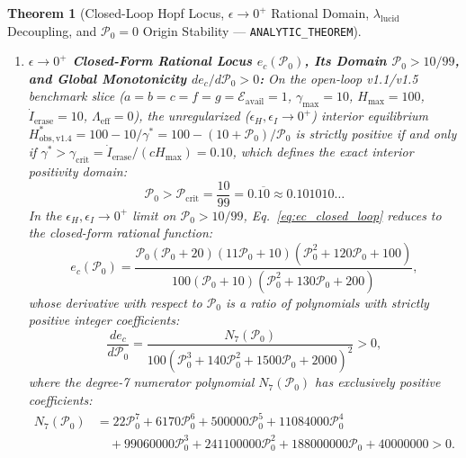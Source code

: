 \documentclass[11pt,a4paper]{article}
\newtheorem{theorem}{Theorem}
\theoremstyle{definition}
\begin{document}
\begin{theorem}[Closed-Loop Hopf Locus, $\epsilon \to 0^+$ Rational Domain, $\lambda_{\mathrm{lucid}}$ Decoupling, and $\mathcal{P}_0 = 0$ Origin Stability --- \texttt{ANALYTIC\_THEOREM}]
\begin{enumerate}
  \item \textbf{$\epsilon \to 0^+$ Closed-Form Rational Locus $e_c(\mathcal{P}_0)$, Its Domain $\mathcal{P}_0 > 10/99$, and Global Monotonicity $de_c/d\mathcal{P}_0 > 0$:} On the open-loop v1.1/v1.5 benchmark slice ($a=b=c=f=g=\mathcal{E}_{\mathrm{avail}}=1$, $\gamma_{\max}=10$, $H_{\max}=100$, $\dot{I}_{\mathrm{erase}}=10$, $\Lambda_{\mathrm{eff}}=0$), the unregularized ($\epsilon_H, \epsilon_I \to 0^+$) interior equilibrium $H_{\mathrm{obs},\mathrm{v1.4}}^* = 100 - 10/\gamma^* = 100 - (10+\mathcal{P}_0)/\mathcal{P}_0$ is strictly positive if and only if $\gamma^* > \gamma_{\mathrm{crit}} = \dot{I}_{\mathrm{erase}}/(c H_{\max}) = 0.10$, which defines the exact interior positivity domain:
  \begin{equation}
  \label{eq:Pcrit_domain}
  \mathcal{P}_0 > \mathcal{P}_{\mathrm{crit}} = \frac{10}{99} = 0.\overline{10} \approx 0.101010\dots
  \end{equation}
  In the $\epsilon_H, \epsilon_I \to 0^+$ limit on $\mathcal{P}_0 > 10/99$, Eq.~\eqref{eq:ec_closed_loop} reduces to the closed-form rational function:
  \begin{equation}
  \label{eq:ec_rational_poly}
  e_c(\mathcal{P}_0) = \frac{\mathcal{P}_0(\mathcal{P}_0 + 20)(11\mathcal{P}_0 + 10)(\mathcal{P}_0^2 + 120\mathcal{P}_0 + 100)}{100(\mathcal{P}_0 + 10)(\mathcal{P}_0^2 + 130\mathcal{P}_0 + 200)},
  \end{equation}
  whose derivative with respect to $\mathcal{P}_0$ is a ratio of polynomials with strictly positive integer coefficients:
  \begin{equation}
  \label{eq:dec_dP_positive}
  \frac{de_c}{d\mathcal{P}_0} = \frac{N_7(\mathcal{P}_0)}{100\left(\mathcal{P}_0^3 + 140\mathcal{P}_0^2 + 1500\mathcal{P}_0 + 2000\right)^2} > 0,
  \end{equation}
  where the degree-7 numerator polynomial $N_7(\mathcal{P}_0)$ has exclusively positive coefficients:
  \begin{equation}
  \begin{aligned}
  N_7(\mathcal{P}_0) &= 22\mathcal{P}_0^7 + 6170\mathcal{P}_0^6 + 500000\mathcal{P}_0^5 + 11084000\mathcal{P}_0^4 \\
  &\quad + 99060000\mathcal{P}_0^3 + 241100000\mathcal{P}_0^2 + 188000000\mathcal{P}_0 + 40000000 > 0.
  \end{aligned}
  \end{equation}

\end{enumerate}
\end{theorem}
\end{document}
